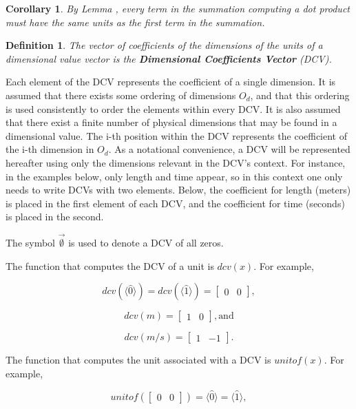 \documentclass[10pt,letterpaper]{article}
\newtheorem{defn}{Definition}[section]
\newtheorem{cor}{Corollary}[section]
\numberwithin{equation}{section}
\begin{document}
\begin{cor}By Lemma \label{terms_of_a_summation_have_equal_units},
every term in the summation computing a dot product must have the same
units as the first term in the summation.\end{cor}

\begin{defn}The vector of coefficients of the dimensions of the units
  of a dimensional value vector is the \textbf{Dimensional
    Coefficients Vector} (DCV).\end{defn}

Each element of the DCV represents the coefficient of a single
dimension.  It is assumed that there exists some ordering of
dimensions $O_d$, and that this ordering is used consistently to order
the elements within every DCV.  It is also assumed that there exist a
finite number of physical dimensions that may be found in a
dimensional value.  The i-th position within the DCV represents the
coefficient of the i-th dimension in $O_d$.  As a notational
convenience, a DCV will be represented hereafter using only the
dimensions relevant in the DCV's context.  For instance, in the
examples below, only length and time appear, so in this context one
only needs to write DCVs with two elements.  Below, the coefficient
for length (meters) is placed in the first element of each DCV, and
the coefficient for time (seconds) is placed in the second.

The symbol $\vec{\emptyset}$ is used to denote a DCV of all zeros.

The function that computes the DCV of a unit is $dcv(x)$.  For
example,

\[ dcv(\langle\hat 0 \rangle) = dcv(\langle\hat 1 \rangle) =
\left[ \begin{matrix} 0 & 0 \end{matrix} \right] , \]

\[ dcv(m) = \left[ \begin{matrix} 1 & 0 \end{matrix} \right] , \mbox{and} \]

\[ dcv(m/s) = \left[ \begin{matrix} 1 & -1 \end{matrix} \right] . \]

The function that computes the unit associated with a DCV is
$unitof(x)$.  For example,

\[ unitof(\left[ \begin{matrix} 0 & 0 \end{matrix} \right]) =
\langle\hat 0 \rangle = \langle\hat 1 \rangle , \]
\end{document}
